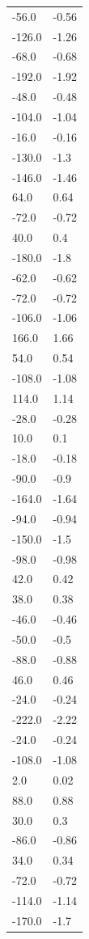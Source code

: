 \begin{longtable}{ll}
-56.0 & -0.56 \\
-126.0 & -1.26 \\
-68.0 & -0.68 \\
-192.0 & -1.92 \\
-48.0 & -0.48 \\
-104.0 & -1.04 \\
-16.0 & -0.16 \\
-130.0 & -1.3 \\
-146.0 & -1.46 \\
64.0 & 0.64 \\
-72.0 & -0.72 \\
40.0 & 0.4 \\
-180.0 & -1.8 \\
-62.0 & -0.62 \\
-72.0 & -0.72 \\
-106.0 & -1.06 \\
166.0 & 1.66 \\
54.0 & 0.54 \\
-108.0 & -1.08 \\
114.0 & 1.14 \\
-28.0 & -0.28 \\
10.0 & 0.1 \\
-18.0 & -0.18 \\
-90.0 & -0.9 \\
-164.0 & -1.64 \\
-94.0 & -0.94 \\
-150.0 & -1.5 \\
-98.0 & -0.98 \\
42.0 & 0.42 \\
38.0 & 0.38 \\
-46.0 & -0.46 \\
-50.0 & -0.5 \\
-88.0 & -0.88 \\
46.0 & 0.46 \\
-24.0 & -0.24 \\
-222.0 & -2.22 \\
-24.0 & -0.24 \\
-108.0 & -1.08 \\
2.0 & 0.02 \\
88.0 & 0.88 \\
30.0 & 0.3 \\
-86.0 & -0.86 \\
34.0 & 0.34 \\
-72.0 & -0.72 \\
-114.0 & -1.14 \\
-170.0 & -1.7 \\

\end{longtable}
